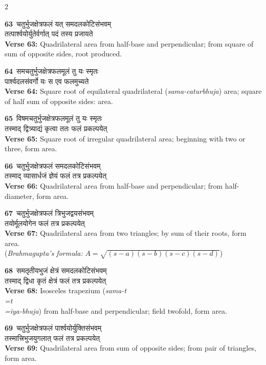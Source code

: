 \documentclass[11pt,a4paper]{article}
\newcommand{\dev}[1]{{\devanagarifont #1}}
\newcommand{\iast}[1]{\textit{#1}}
\newcommand{\vnum}[1]{\textcolor{versenumbercolor}{\textbf{#1}}}
\begin{document}
\begin{paracol}{2}

\switchcolumn[0]
\vnum{63}\ \dev{चतुर्भुजक्षेत्रफलं यत् समदलकोटिसंभवम्}\\
\dev{तत्पार्श्वयोर्युतेर्वर्गात् पदं तस्य प्रजायते}\\
\switchcolumn[1]
\textbf{Verse 63:} Quadrilateral area from half-base and perpendicular; from square of sum of opposite sides, root produced.

\switchcolumn[0]
\vnum{64}\ \dev{समचतुर्भुजक्षेत्रफलमूलं तु यः स्मृतः}\\
\dev{पार्श्वदलसंवर्गो यः स एव फलमुच्यते}\\
\switchcolumn[1]
\textbf{Verse 64:} Square root of equilateral quadrilateral (\iast{sama-caturbhuja}) area; square of half sum of opposite sides: area.

\switchcolumn[0]
\vnum{65}\ \dev{विषमचतुर्भुजक्षेत्रफलमूलं तु यः स्मृतः}\\
\dev{तस्माद् द्वित्र्याद्यं कृत्वा ततः फलं प्रकल्पयेत्}\\
\switchcolumn[1]
\textbf{Verse 65:} Square root of irregular quadrilateral area; beginning with two or three, form area.

\switchcolumn[0]
\vnum{66}\ \dev{चतुर्भुजक्षेत्रफलं समदलकोटिसंभवम्}\\
\dev{तस्माद् व्यासार्धजं ज्ञेयं फलं तत्र प्रकल्पयेत्}\\
\switchcolumn[1]
\textbf{Verse 66:} Quadrilateral area from half-base and perpendicular; from half-diameter, form area.

\switchcolumn[0]
\vnum{67}\ \dev{चतुर्भुजक्षेत्रफलं त्रिभुजद्वयसंभवम्}\\
\dev{तयोर्मूलयोगेन फलं तत्र प्रकल्पयेत्}\\
\switchcolumn[1]
\textbf{Verse 67:} Quadrilateral area from two triangles; by sum of their roots, form area.\\
(\textit{Brahmagupta's formula:} $A = \sqrt{(s-a)(s-b)(s-c)(s-d)}$)

\switchcolumn[0]
\vnum{68}\ \dev{समतृतीयभुजं क्षेत्रं समदलकोटिसंभवम्}\\
\dev{तस्माद् द्विधा कृतं क्षेत्रं फलं तत्र प्रकल्पयेत्}\\
\switchcolumn[1]
\textbf{Verse 68:} Isosceles trapezium (\iast{sama-t\\=t\\=iya-bhuja}) from half-base and perpendicular; field twofold, form area.

\switchcolumn[0]
\vnum{69}\ \dev{चतुर्भुजक्षेत्रफलं पार्श्वयोर्युक्तिसंभवम्}\\
\dev{तस्मात्त्रिभुजयुगलात् फलं तत्र प्रकल्पयेत्}\\
\switchcolumn[1]
\textbf{Verse 69:} Quadrilateral area from sum of opposite sides; from pair of triangles, form area.


\end{paracol}
\end{document}
